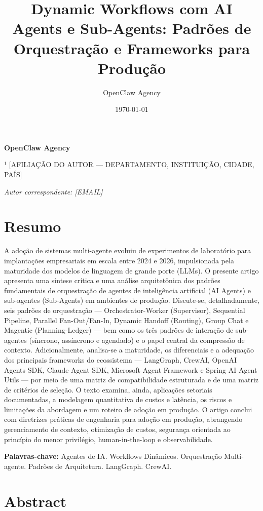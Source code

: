 \documentclass[12pt,a4paper]{article}
\title{Dynamic Workflows com AI Agents e Sub-Agents: Padrões de Orquestração e Frameworks para Produção}
\author{OpenClaw Agency}
\date{\today}
\begin{document}
\maketitle

\textbf{OpenClaw Agency}

¹ [AFILIAÇÃO DO AUTOR — DEPARTAMENTO, INSTITUIÇÃO, CIDADE, PAÍS]

\textit{Autor correspondente: [EMAIL]}


\section*{Resumo}

A adoção de sistemas multi-agente evoluiu de experimentos de laboratório para implantações empresariais em escala entre 2024 e 2026, impulsionada pela maturidade dos modelos de linguagem de grande porte (LLMs). O presente artigo apresenta uma síntese crítica e uma análise arquitetônica dos padrões fundamentais de orquestração de agentes de inteligência artificial (AI Agents) e sub-agentes (Sub-Agents) em ambientes de produção. Discute-se, detalhadamente, seis padrões de orquestração — Orchestrator-Worker (Supervisor), Sequential Pipeline, Parallel Fan-Out/Fan-In, Dynamic Handoff (Routing), Group Chat e Magentic (Planning-Ledger) — bem como os três padrões de interação de sub-agentes (síncrono, assíncrono e agendado) e o papel central da compressão de contexto. Adicionalmente, analisa-se a maturidade, os diferenciais e a adequação dos principais frameworks do ecossistema — LangGraph, CrewAI, OpenAI Agents SDK, Claude Agent SDK, Microsoft Agent Framework e Spring AI Agent Utils — por meio de uma matriz de compatibilidade estruturada e de uma matriz de critérios de seleção. O texto examina, ainda, aplicações setoriais documentadas, a modelagem quantitativa de custos e latência, os riscos e limitações da abordagem e um roteiro de adoção em produção. O artigo conclui com diretrizes práticas de engenharia para adoção em produção, abrangendo gerenciamento de contexto, otimização de custos, segurança orientada ao princípio do menor privilégio, human-in-the-loop e observabilidade.

\textbf{Palavras-chave:} Agentes de IA. Workflows Dinâmicos. Orquestração Multi-agente. Padrões de Arquitetura. LangGraph. CrewAI.


\section*{Abstract}
\end{document}
